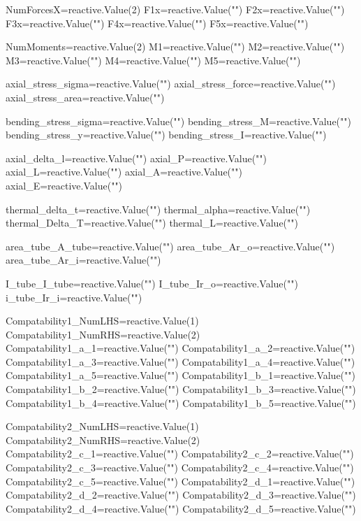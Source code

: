 \documentclass[
  letterpaper,
  DIV=11,
  numbers=noendperiod]{scrreprt}
\newenvironment{Shaded}{\begin{snugshade}}{\end{snugshade}}
\newcommand{\NormalTok}[1]{\textcolor[rgb]{0.00,0.23,0.31}{#1}}
\begin{document}
\begin{Shaded}
\begin{Highlighting}[]
\NormalTok{NumForcesX=reactive.Value(2)}
\NormalTok{F1x=reactive.Value("")}
\NormalTok{F2x=reactive.Value("")}
\NormalTok{F3x=reactive.Value("")}
\NormalTok{F4x=reactive.Value("")}
\NormalTok{F5x=reactive.Value("")}

\NormalTok{NumMoments=reactive.Value(2)}
\NormalTok{M1=reactive.Value("")}
\NormalTok{M2=reactive.Value("")}
\NormalTok{M3=reactive.Value("")}
\NormalTok{M4=reactive.Value("")}
\NormalTok{M5=reactive.Value("")}

\NormalTok{axial\_stress\_sigma=reactive.Value("")}
\NormalTok{axial\_stress\_force=reactive.Value("")}
\NormalTok{axial\_stress\_area=reactive.Value("")}

\NormalTok{bending\_stress\_sigma=reactive.Value("")}
\NormalTok{bending\_stress\_M=reactive.Value("")}
\NormalTok{bending\_stress\_y=reactive.Value("")}
\NormalTok{bending\_stress\_I=reactive.Value("")}

\NormalTok{axial\_delta\_l=reactive.Value("")}
\NormalTok{axial\_P=reactive.Value("")}
\NormalTok{axial\_L=reactive.Value("")}
\NormalTok{axial\_A=reactive.Value("")}
\NormalTok{axial\_E=reactive.Value("")}

\NormalTok{thermal\_delta\_t=reactive.Value("")}
\NormalTok{thermal\_alpha=reactive.Value("")}
\NormalTok{thermal\_Delta\_T=reactive.Value("")}
\NormalTok{thermal\_L=reactive.Value("")}

\NormalTok{area\_tube\_A\_tube=reactive.Value("")}
\NormalTok{area\_tube\_Ar\_o=reactive.Value("")}
\NormalTok{area\_tube\_Ar\_i=reactive.Value("")}

\NormalTok{I\_tube\_I\_tube=reactive.Value("")}
\NormalTok{I\_tube\_Ir\_o=reactive.Value("")}
\NormalTok{i\_tube\_Ir\_i=reactive.Value("")}

\NormalTok{Compatability1\_NumLHS=reactive.Value(1)}
\NormalTok{Compatability1\_NumRHS=reactive.Value(2)}
\NormalTok{Compatability1\_a\_1=reactive.Value("")}
\NormalTok{Compatability1\_a\_2=reactive.Value("")}
\NormalTok{Compatability1\_a\_3=reactive.Value("")}
\NormalTok{Compatability1\_a\_4=reactive.Value("")}
\NormalTok{Compatability1\_a\_5=reactive.Value("")}
\NormalTok{Compatability1\_b\_1=reactive.Value("")}
\NormalTok{Compatability1\_b\_2=reactive.Value("")}
\NormalTok{Compatability1\_b\_3=reactive.Value("")}
\NormalTok{Compatability1\_b\_4=reactive.Value("")}
\NormalTok{Compatability1\_b\_5=reactive.Value("")}

\NormalTok{Compatability2\_NumLHS=reactive.Value(1)}
\NormalTok{Compatability2\_NumRHS=reactive.Value(2)}
\NormalTok{Compatability2\_c\_1=reactive.Value("")}
\NormalTok{Compatability2\_c\_2=reactive.Value("")}
\NormalTok{Compatability2\_c\_3=reactive.Value("")}
\NormalTok{Compatability2\_c\_4=reactive.Value("")}
\NormalTok{Compatability2\_c\_5=reactive.Value("")}
\NormalTok{Compatability2\_d\_1=reactive.Value("")}
\NormalTok{Compatability2\_d\_2=reactive.Value("")}
\NormalTok{Compatability2\_d\_3=reactive.Value("")}
\NormalTok{Compatability2\_d\_4=reactive.Value("")}
\NormalTok{Compatability2\_d\_5=reactive.Value("")}


\end{Highlighting}
\end{Shaded}
\end{document}

